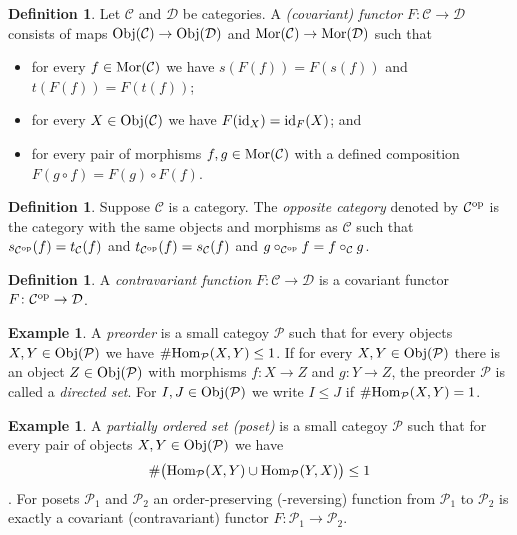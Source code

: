 \documentclass[12pt]{article}
\theoremstyle{definition}
\newtheorem{dfn}[thm]{Definition}
\newtheorem{exm}[thm]{Example}
\theoremstyle{remark}
\newcommand{\catvar}[1]{\mathcal{#1}}
\newcommand{\CC}{\catvar{C}}
\newcommand{\DD}{\catvar{D}}
\newcommand{\PP}{\catvar{P}}
\newcommand{\Obj}[1]{\textup{Obj}(#1)}
\newcommand{\Mor}[1]{\textup{Mor}(#1)}
\begin{document}
    \begin{dfn}
        Let $\CC$ and $\DD$ be categories. A \emph{(covariant) functor} $F\colon\CC\to\DD$ consists of maps $\Obj{\CC}\to\Obj{\DD}$ and $\Mor{\CC}\to\Mor{\DD}$ such that
        \begin{itemize}
            \item for every $f\in\Mor{\CC}$ we have $s(F(f))=F(s(f))$ and $t(F(f))=F(t(f))$;
            \item for every $X\in\Obj{\CC}$ we have $F(\textup{id}_X)=\textup{id}_F(X)$; and
            \item for every pair of morphisms $f,g\in\Mor{\CC}$ with a defined composition $F(g\circ f)=F(g)\circ F(f)$.
        \end{itemize}
    \end{dfn}

    \begin{dfn}
        Suppose $\CC$ is a category. The \emph{opposite category} denoted by $\CC^{\textup{op}}$ is the category with the same objects and morphisms as $\CC$ such that $s_{\CC^{\textup{op}}}(f)=t_{\CC}(f)$ and $t_{\CC^{\textup{op}}}(f)=s_{\CC}(f)$ and $g\circ_{\CC^\textup{op}} f=f\circ_\CC g$.
    \end{dfn}

    \begin{dfn}
        A \emph{contravariant function} $F\colon\CC\to\DD$ is a covariant functor $F\colon\CC^\textup{op}\to\DD$.
    \end{dfn}

    \begin{exm}
        A \emph{preorder} is a small categoy $\PP$ such that for every objects $X,Y\in\Obj{\PP}$ we have $\#\textup{Hom}_\PP(X,Y)\leq1$. If for every $X,Y\in\Obj{\PP}$ there is an object $Z\in\Obj{\PP}$ with morphisms $f\colon X\to Z$ and $g\colon Y\to Z$, the preorder $\PP$ is called a \emph{directed set}. For $I,J\in\Obj{\PP}$ we write $I\leq J$ if $\#\textup{Hom}_\PP(X,Y)=1$.
    \end{exm}

    \begin{exm}
        A \emph{partially ordered set (poset)} is a small categoy $\PP$ such that for every pair of objects $X,Y\in\Obj{\PP}$ we have $$\#\big(\textup{Hom}_\PP(X,Y)\cup\textup{Hom}_\PP(Y,X)\big)\leq1$$. For posets $\PP_1$ and $\PP_2$ an order-preserving (-reversing) function from $\PP_1$ to $\PP_2$ is exactly a covariant (contravariant) functor $F\colon\PP_1\to\PP_2$.
    \end{exm}
\end{document}
